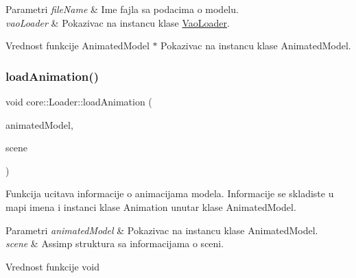 \begin{DoxyParams}{Parametri}
{\em file\+Name} & Ime fajla sa podacima o modelu. \\
\hline
{\em vao\+Loader} & Pokazivac na instancu klase \hyperlink{classcore_1_1VaoLoader}{Vao\+Loader}. \\
\hline
\end{DoxyParams}
\begin{DoxyReturn}{Vrednost funkcije}
Animated\+Model $\ast$ Pokazivac na instancu klase Animated\+Model. 
\end{DoxyReturn}
\mbox{\label{classcore_1_1Loader_a228087d022e5102cc4e40b12e7ecf9fa}} 
\subsubsection{\texorpdfstring{load\+Animation()}{loadAnimation()}}
{\footnotesize\ttfamily void core\+::\+Loader\+::load\+Animation (\begin{DoxyParamCaption}\item[{\hyperlink{classmodel_1_1AnimatedModel}{Animated\+Model} $\ast$}]{animated\+Model,  }\item[{const ai\+Scene $\ast$}]{scene }\end{DoxyParamCaption})\hspace{0.3cm}{\ttfamily [private]}}



Funkcija ucitava informacije o animacijama modela. Informacije se skladiste u mapi imena i instanci klase Animation unutar klase Animated\+Model. 


\begin{DoxyParams}{Parametri}
{\em animated\+Model} & Pokazivac na instancu klase Animated\+Model. \\
\hline
{\em scene} & Assimp struktura sa informacijama o sceni. \\
\hline
\end{DoxyParams}
\begin{DoxyReturn}{Vrednost funkcije}
void 
\end{DoxyReturn}
\mbox{\label{classcore_1_1Loader_acfe1b4eb91cac78068c8c1edefe460b3}} 
